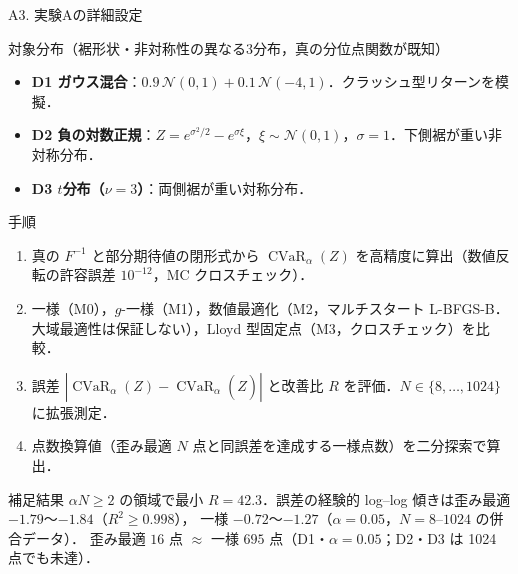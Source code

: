 \documentclass[aspectratio=169, 10pt]{beamer}
\providecommand{\Finv}{}\renewcommand{\Finv}{F^{-1}}
\DeclareMathOperator{\CVaR}{CVaR}
\begin{document}
\begin{frame}{A3. 実験Aの詳細設定}
  \footnotesize
  \begin{block}{対象分布（裾形状・非対称性の異なる3分布，真の分位点関数が既知）}
    \begin{itemize}
      \item \textbf{D1 ガウス混合}：$0.9\,\mathcal N(0,1)+0.1\,\mathcal N(-4,1)$．クラッシュ型リターンを模擬．
      \item \textbf{D2 負の対数正規}：$Z=e^{\sigma^2/2}-e^{\sigma\xi}$，$\xi\sim\mathcal N(0,1)$，$\sigma=1$．下側裾が重い非対称分布．
      \item \textbf{D3 $t$分布（$\nu=3$）}：両側裾が重い対称分布．
    \end{itemize}
  \end{block}
  \begin{block}{手順}
    \begin{enumerate}
      \item 真の $\Finv$ と部分期待値の閉形式から $\CVaR_\alpha(Z)$ を高精度に算出（数値反転の許容誤差 $10^{-12}$，MC クロスチェック）．
      \item 一様（M0），$g$-一様（M1），数値最適化（M2，マルチスタート L-BFGS-B．大域最適性は保証しない），Lloyd 型固定点（M3，クロスチェック）を比較．
      \item 誤差 $|\CVaR_\alpha(Z)-\CVaR_\alpha(\hat Z)|$ と改善比 $R$ を評価．$N\in\{8,\dots,1024\}$ に拡張測定．
      \item 点数換算値（歪み最適 $N$ 点と同誤差を達成する一様点数）を二分探索で算出．
    \end{enumerate}
  \end{block}
  \begin{exampleblock}{補足結果}
    $\alpha N\ge 2$ の領域で最小 $R=42.3$．誤差の経験的 log--log 傾きは歪み最適 $-1.79$〜$-1.84$（$R^2\ge0.998$），
    一様 $-0.72$〜$-1.27$（$\alpha=0.05$，$N=8$--$1024$ の併合データ）．
    歪み最適 $16$ 点 $\approx$ 一様 $695$ 点（D1・$\alpha=0.05$；D2・D3 は 1024 点でも未達）．
  \end{exampleblock}
\end{frame}
\end{document}
